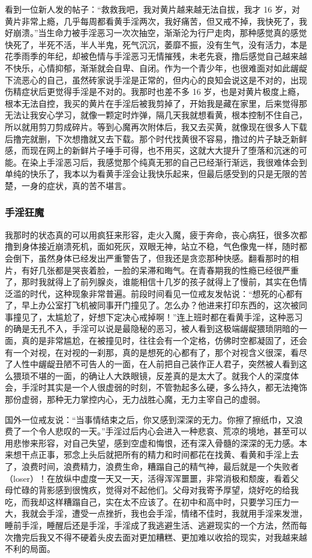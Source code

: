 看到一位新人发的帖子：“救救我吧，我对黄片越来越无法自拔，我才 16 岁，对黄片非常上瘾，几乎每周都看黄手淫两次，我好痛苦，但又戒不掉，我快死了，我好崩溃。”当生命力被手淫恶习一次次抽空，渐渐沦为行尸走肉，那种感觉真的感觉快死了，半死不活，半人半鬼，死气沉沉，萎靡不振，没有生气，没有活力，本是花季雨季的年纪，却被色情与手淫恶习无情摧残，未老先衰，撸后感觉自己越来越不快乐，心情抑郁，渐渐就会自卑、自闭。作为一个青少年，也很难面对如此龌龊下流恶心的自己，虽然砖家说手淫是正常的，但内心的良知会说这是不对的，出现伤精症状后更觉得手淫是不对的。我那时也差不多 16 岁，也是对黄片极度上瘾，根本无法自控，我买的黄片在手淫后被我剪掉了，开始我是藏在家里，后来觉得那无法让我安心学习，就像一颗定时炸弹，隔几天我就想看黄，根本控制不住自己，所以就用剪刀剪成碎片。等到心魔再次附体后，我又去买黄，就像现在很多人下载后撸完就删，下次想撸就又去下载。那个时代找黄很不容易，撸过的片子缺乏新鲜感，而现在网上的新鲜片子唾手可得，也不用买，这就大大提升了堕落和沉迷的可能。在染上手淫恶习后，我感觉那个纯真无邪的自己已经渐行渐远，我很难体会到单纯的快乐了，我本以为看黄手淫会让我快乐起来，但最后感受到的只是无限的苦楚，一身的症状，真的苦不堪言。

\subsubsection{手淫狂魔}

我那时的状态真的可以用疯狂来形容，走火入魔，疲于奔命，丧心病狂，很多次都撸到身体接近崩溃死机，面如死灰，双眼无神，站立不稳，气色像鬼一样，随时都会倒下，虽然身体已经发出严重警告了，但我还是贪恋那种快感。翻看那时的相片，有好几张都是哭丧着脸，一脸的呆滞和晦气。在青春期我的性瘾已经很严重了，那时我就得上了前列腺炎，谁能相信十几岁的孩子就得上了慢前，其实在色情泛滥的时代，这种现象非常普遍。前段时间看见一位戒友发帖说：“想死的心都有了，早上办公室打飞机被同事开门撞见了。怎么办？他进来打印东西的，这次被同事撞见了，太尴尬了，好想下定决心戒掉啊！”连上班时都在看黄手淫，这种恶习的确是无孔不入，手淫可以说是最隐秘的恶习，被人看到这极端龌龊猥琐阴暗的一面，真的是非常尴尬，在被撞见时，往往会有一个定格，仿佛时空都凝固了，还会有一个对视，在对视的一刹那，真的是想死的心都有了，那个对视含义很深，看尽了人性中龌龊丑陋不可告人的一面，在人前把自己装作正人君子，突然被人看到这么猥琐不堪的一面，的确让人大跌眼镜，反差真的是太大了。就我个人的深度体会，手淫时其实是一个人很虚弱的时刻，不管勃起多么硬，多么持久，都无法掩饰那份虚弱，那种无力掌控内心，无力战胜心魔，无力主宰自己的虚弱。

国外一位戒友说：“当事情结束之后，你又感到深深的无力。你擦了擦纸巾，又浪费了一个令人悲叹的一天。”手淫过后内心会进入一种悲哀、荒凉的境地，甚至可以用悲惨来形容，对自己失望，感到空虚和悔恨，还有深入骨髓的深深的无力感。本来想干点正事，邪念上头后就把所有的精力和时间都花在找黄、看黄和手淫上去了，浪费时间，浪费精力，浪费生命，糟蹋自己的精气神，最后就是一个失败者（loser）！在放纵中虚度一天又一天，活得浑浑噩噩，非常消极和颓废，看着父母忙碌的背影感到很愧疚，觉得对不起他们。父母对我寄予厚望，烧好吃的给我吃，而我却这样糟蹋自己，实在太不应该了。在初中和高中时，只要学习压力一大，我就会手淫，遭受一点挫折，我也会手淫，情绪不佳时，我就用手淫来发泄，睡前手淫，睡醒后还是手淫，手淫成了我逃避生活、逃避现实的一个方法，然而每次撸完后我又不得不硬着头皮去面对更加糟糕、更加难以收拾的现实，对我越来越不利的局面。

